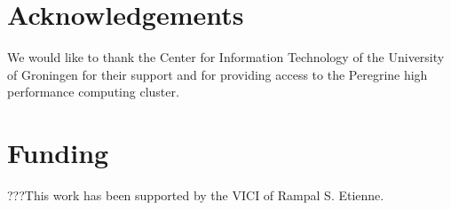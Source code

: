 \documentclass{bioinfo}
\begin{document}
\section*{Acknowledgements}

We would like to thank the Center for Information Technology of the University of Groningen for their support
and for providing access to the Peregrine high performance computing cluster.

\section*{Funding}

???This work has been supported by the VICI of Rampal S. Etienne.


%
%
%
%
%

%



\begin{thebibliography}{}

\end{thebibliography}
\end{document}
